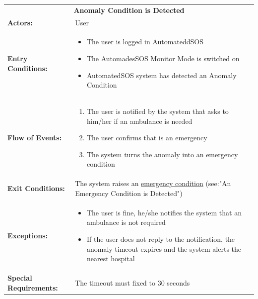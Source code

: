 \begin{table}[H]
	\centering
	{\renewcommand{\arraystretch}{1.5}%
		\begin{tabular}{|@{\hspace{2em}} p{4cm} @{}| p{11cm} @{\qquad}|}
			\cline{1-2}
			\multicolumn{2}{|c|}{\textbf{Anomaly Condition is Detected}} \\ \cline{1-2}
			\textbf{Actors:} & User\\ \cline{1-2}
			\textbf{Entry Conditions:} & \begin{itemize}[topsep=0em, itemsep=-0.2em]
				\item The user is logged in AutomateddSOS
				\item The AutomadesSOS Monitor Mode is switched on
				\item AutomatedSOS system has detected an Anomaly Condition 
			\end{itemize} \\ \cline{1-2}
			\textbf{Flow of Events:} & \begin{enumerate}[topsep=0em, itemsep=-0.2em]
				\item The user is notified by the system that asks to him/her if an ambulance is needed 
				\item The user confirms that is an emergency
				\item The system turns the anomaly into an emergency condition
			\end{enumerate}\\ \cline{1-2}
			\textbf{Exit Conditions:} & The system raises an \underline{emergency condition} (see:"An Emergency Condition is Detected")\\ \cline{1-2}
			\textbf{Exceptions:} & \begin{itemize}[topsep=0em, itemsep=-0.2em]
				\item The user is fine, he/she notifies the system that an ambulance is not required
				\item If the user does not reply to the notification, the anomaly timeout expires and the system alerts the nearest hospital
			\end{itemize} \\ \cline{1-2}
			\textbf{Special Requirements:} & The timeout must fixed to 30 seconds \\ \cline{1-2}
	\end{tabular}} \quad
\end{table}

